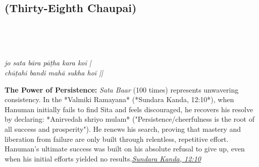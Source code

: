 
\newpage

\subsection*{ (Thirty-Eighth Chaupai)}

\begin{minipage}[t]{0.55\textwidth}
\vspace{0pt}

{\large \linespread{1.5}\selectfont
{}\\
\par}

\vspace{0.5em}

{\large \linespread{1.5}\selectfont
{}\\
\par}

\vspace{0.5em}

{\large \linespread{1.3}\selectfont
\textit{jo sata bāra pāṭha kara koī |}\\
\textit{chūṭahi bandi mahā sukha hoī ||}
\par}
\end{minipage}%
\hfill
\begin{minipage}[t]{0.42\textwidth}
\vspace{0pt}
\begin{tcolorbox}[anchorbox]
\textbf{The Power of Persistence:} \textit{Sata Baar} (100 times) represents unwavering consistency. In the *Valmiki Ramayana* (*Sundara Kanda, 12:10*), when Hanuman initially fails to find Sita and feels discouraged, he recovers his resolve by declaring: *Anirvedah shriyo mulam* ("Persistence/cheerfulness is the root of all success and prosperity"). He renews his search, proving that mastery and liberation from failure are only built through relentless, repetitive effort.
\vspace{0.5em}\newline Hanuman's ultimate success was built on his absolute refusal to give up, even when his initial efforts yielded no results.\newline\null\hfill\href{https://www.valmiki.iitk.ac.in/sloka?field_kanda_tid=5&language=dv&field_sarga_value=12}{\textit{Sundara Kanda, 12:10}}
\end{tcolorbox}
\end{minipage}

